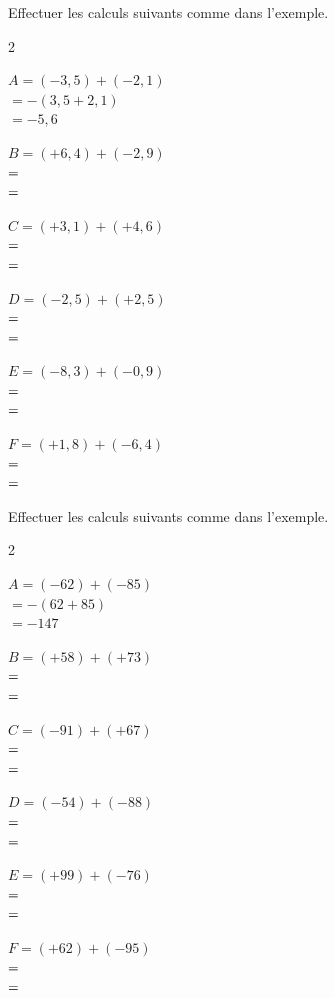 \documentclass[11pt]{article}
\begin{document}
\begin{exercice}[2]
Effectuer les calculs suivants comme dans l'exemple.

\begin{multicols}{2}

$A = (-3{,}5) + (-2{,}1)$\\
$= -(3{,}5 + 2{,}1)$\\
$= -5{,}6$

\bigskip

$B = (+6{,}4) + (-2{,}9)$\\
$= \dotfill$\\
$= \dotfill$

\bigskip

$C = (+3{,}1) + (+4{,}6)$\\
$= \dotfill$\\
$= \dotfill$

\columnbreak

$D = (-2{,}5) + (+2{,}5)$\\
$= \dotfill$\\
$= \dotfill$

\bigskip

$E = (-8{,}3) + (-0{,}9)$\\
$= \dotfill$\\
$= \dotfill$

\bigskip

$F = (+1{,}8) + (-6{,}4)$\\
$= \dotfill$\\
$= \dotfill$

\end{multicols}
\end{exercice}

\begin{exercice}[3]
Effectuer les calculs suivants comme dans l'exemple.

\begin{multicols}{2}

$A = (-62) + (-85)$\\
$= -(62 + 85)$\\
$= -147$

\bigskip

$B = (+58) + (+73)$\\
$= \dotfill$\\
$= \dotfill$

\bigskip

$C = (-91) + (+67)$\\
$= \dotfill$\\
$= \dotfill$

\columnbreak

$D = (-54) + (-88)$\\
$= \dotfill$\\
$= \dotfill$

\bigskip

$E = (+99) + (-76)$\\
$= \dotfill$\\
$= \dotfill$

\bigskip

$F = (+62) + (-95)$\\
$= \dotfill$\\
$= \dotfill$

\end{multicols}
\end{exercice}
\end{document}
